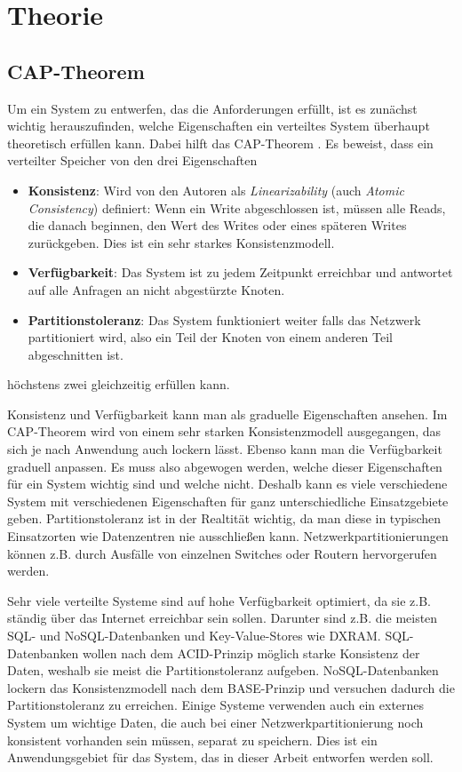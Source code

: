 \chapter{Theorie}
\label{theory}

\section{CAP-Theorem}
\label{cap}

Um ein System zu entwerfen, das die Anforderungen erfüllt, ist es zunächst wichtig herauszufinden, welche Eigenschaften ein verteiltes System überhaupt theoretisch erfüllen kann. Dabei hilft das CAP-Theorem \cite{cap}. Es beweist, dass ein verteilter Speicher von den drei Eigenschaften 
\begin{itemize}
	\item \textbf{Konsistenz}: Wird von den Autoren als \textit{Linearizability} (auch \textit{Atomic Consistency}) definiert: Wenn ein Write abgeschlossen ist, müssen alle Reads, die danach beginnen, den Wert des Writes oder eines späteren Writes zurückgeben. Dies ist ein sehr starkes Konsistenzmodell.
	\item \textbf{Verfügbarkeit}: Das System ist zu jedem Zeitpunkt erreichbar und antwortet auf alle Anfragen an nicht abgestürzte Knoten.
	\item \textbf{Partitionstoleranz}: Das System funktioniert weiter falls das Netzwerk partitioniert wird, also ein Teil der Knoten von einem anderen Teil abgeschnitten ist.
\end{itemize}
 höchstens zwei gleichzeitig erfüllen kann. 

Konsistenz und Verfügbarkeit kann man als graduelle Eigenschaften ansehen. Im CAP-Theorem wird von einem sehr starken Konsistenzmodell ausgegangen, das sich je nach Anwendung auch lockern lässt. Ebenso kann man die Verfügbarkeit graduell anpassen. Es muss also abgewogen werden, welche dieser Eigenschaften für ein System wichtig sind und welche nicht. Deshalb kann es viele verschiedene System mit verschiedenen Eigenschaften für ganz unterschiedliche Einsatzgebiete geben. Partitionstoleranz ist in der Realtität wichtig, da man diese in typischen Einsatzorten wie Datenzentren nie ausschließen kann. Netzwerkpartitionierungen können z.B. durch Ausfälle von einzelnen Switches oder Routern hervorgerufen werden. 

Sehr viele verteilte Systeme sind auf hohe Verfügbarkeit optimiert, da sie z.B. ständig über das Internet erreichbar sein sollen. Darunter sind z.B. die meisten SQL- und NoSQL-Datenbanken und Key-Value-Stores wie DXRAM. SQL-Datenbanken wollen nach dem ACID-Prinzip möglich starke Konsistenz der Daten, weshalb sie meist die Partitionstoleranz aufgeben. NoSQL-Datenbanken lockern das Konsistenzmodell nach dem BASE-Prinzip und versuchen dadurch die Partitionstoleranz zu erreichen. Einige Systeme verwenden auch ein externes System um wichtige Daten, die auch bei einer Netzwerkpartitionierung noch konsistent vorhanden sein müssen, separat zu speichern. Dies ist ein Anwendungsgebiet für das System, das in dieser Arbeit entworfen werden soll.

